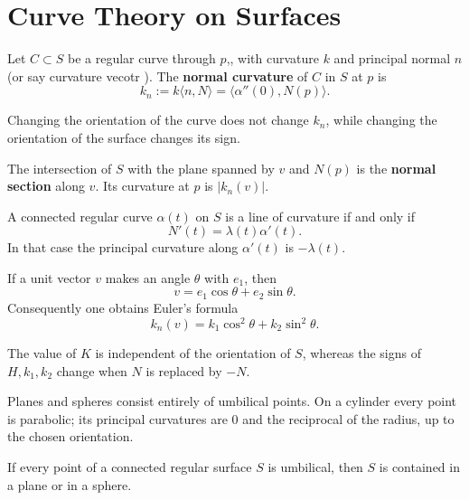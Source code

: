 \documentclass[12pt, oneside]{book}
\begin{document}
\section{Curve Theory on Surfaces}

\begin{definition}
    Let $C\subset S$ be a regular curve through $p$,, with curvature $k$ and principal normal $n$(or say curvature vecotr ).
    The \textbf{normal curvature} of $C$ in $S$ at $p$ is
    \[
        k_n:=k\langle n,N\rangle=\langle\alpha''(0),N(p)\rangle.
    \]
    \begin{remark}
        Changing the orientation of the curve does not change $k_n$, while changing
        the orientation of the surface changes its sign.
    \end{remark}
\end{definition}





The intersection of $S$ with the plane spanned by $v$ and $N(p)$ is the
\textbf{normal section} along $v$.  Its curvature at $p$ is $|k_n(v)|$.



\begin{proposition}
    A connected regular curve $\alpha(t)$ on $S$ is a line of curvature if
    and only if
    \[
        N'(t)=\lambda(t)\alpha'(t).
    \]
    In that case the principal curvature along $\alpha'(t)$ is
    $-\lambda(t)$.
\end{proposition}

If a unit vector $v$ makes an angle $\theta$ with $e_1$, then
\[
    v=e_1\cos\theta+e_2\sin\theta.
\]
Consequently one obtains Euler's formula
\begin{equation}
    k_n(v)=k_1\cos^2\theta+k_2\sin^2\theta.
    \label{eq:euler-normal-curvature}
\end{equation}



The value of $K$ is independent of the orientation of $S$, whereas the signs
of $H,k_1,k_2$ change when $N$ is replaced by $-N$.



Planes and spheres consist entirely of umbilical points.  On a cylinder every
point is parabolic; its principal curvatures are $0$ and the reciprocal of the
radius, up to the chosen orientation.

\begin{proposition}
    If every point of a connected regular surface $S$ is umbilical, then $S$
    is contained in a plane or in a sphere.
\end{proposition}
\end{document}

